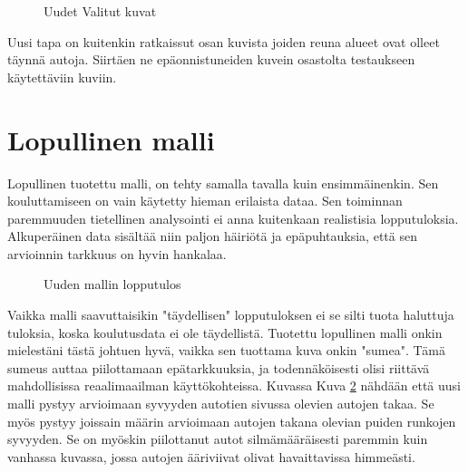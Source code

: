 \begin{figure}[h]
\centering
{}
\caption{Uudet Valitut kuvat}
\label{fig:selected2}
\end{figure}

Uusi tapa on kuitenkin ratkaissut osan kuvista joiden reuna alueet ovat olleet täynnä autoja. Siirtäen ne epäonnistuneiden kuvein osastolta testaukseen käytettäviin kuviin.

\section{Lopullinen malli}

Lopullinen tuotettu malli, on tehty samalla tavalla kuin ensimmäinenkin.
Sen kouluttamiseen on vain käytetty hieman erilaista dataa. Sen toiminnan paremmuuden tietellinen analysointi ei anna kuitenkaan realistisia lopputuloksia.
Alkuperäinen data sisältää niin paljon häiriötä ja epäpuhtauksia, että sen arvioinnin tarkkuus on hyvin hankalaa.

\begin{figure}[h]
\centering
{}
\caption{Uuden mallin lopputulos}
\label{fig:uusi_malli}
\end{figure}


Vaikka malli saavuttaisikin "täydellisen" lopputuloksen ei se silti tuota haluttuja tuloksia, koska koulutusdata ei ole täydellistä.
Tuotettu lopullinen malli onkin mielestäni tästä johtuen hyvä, vaikka sen tuottama kuva onkin "sumea". 
Tämä sumeus auttaa piilottamaan epätarkkuuksia, ja todennäköisesti olisi riittävä mahdollisissa reaalimaailman käyttökohteissa.
Kuvassa Kuva \ref{fig:uusi_malli} nähdään että uusi malli pystyy arvioimaan syvyyden autotien sivussa olevien autojen takaa. 
Se myös pystyy joissain määrin arvioimaan autojen takana olevian puiden runkojen syvyyden. 
Se on myöskin piilottanut autot silmämääräisesti paremmin kuin vanhassa kuvassa, jossa autojen ääriviivat olivat havaittavissa himmeästi.
